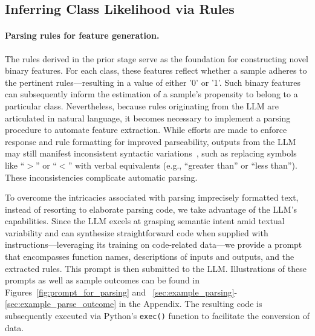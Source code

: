 \subsection{Inferring Class Likelihood via Rules}
\label{Sec:training}

\paragraph{Parsing rules for feature generation.} The rules derived in the prior stage serve as the foundation for constructing novel binary features. For each class, these features reflect whether a sample adheres to the pertinent rules—resulting in a value of either '0' or '1'. Such binary features can subsequently inform the estimation of a sample's propensity to belong to a particular class. Nevertheless, because rules originating from the LLM are articulated in natural language, it becomes necessary to implement a parsing procedure to automate feature extraction. While efforts are made to enforce response and rule formatting for improved parseability, outputs from the LLM may still manifest inconsistent syntactic variations~\cite{kovavc2023large}, such as replacing symbols like ``$>$” or ``$<$” with verbal equivalents (e.g., ``greater than'' or ``less than''). These inconsistencies complicate automatic parsing.

To overcome the intricacies associated with parsing imprecisely formatted text, instead of resorting to elaborate parsing code, we take advantage of the LLM’s capabilities. Since the LLM excels at grasping semantic intent amid textual variability and can synthesize straightforward code when supplied with instructions—leveraging its training on code-related data—we provide a prompt that encompasses function names, descriptions of inputs and outputs, and the extracted rules. This prompt is then submitted to the LLM. Illustrations of these prompts as well as sample outcomes can be found in Figures~\ref{fig:prompt_for_parsing} and ~\ref{sec:example_parsing}-\ref{sec:example_parse_outcome} in the Appendix. The resulting code is subsequently executed via Python’s \texttt{exec()} function to facilitate the conversion of data.

\vspace*{-0.12in}

